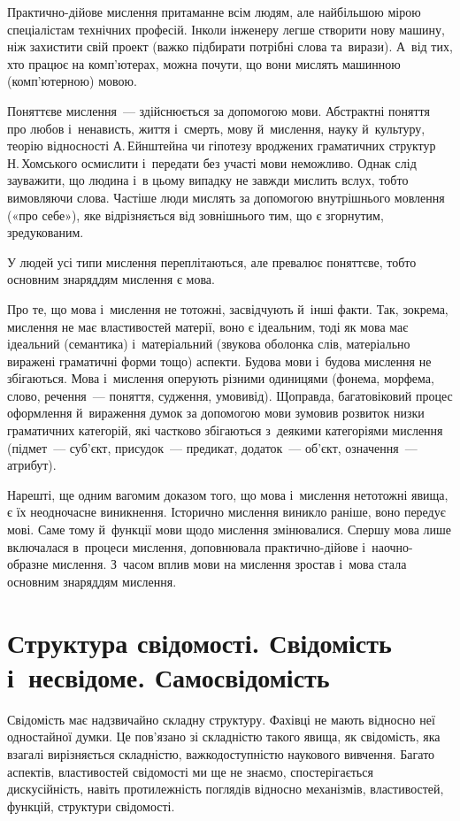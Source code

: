 \documentclass[a5paper,oneside,DIV=12,12pt,headings=small]{scrartcl}
\begin{document}
		Практично-дійове мислення притаманне всім людям, але найбільшою мірою спеціалістам технічних професій. Інколи інженеру легше створити нову машину, ніж захистити свій проект (важко підбирати потрібні слова та~вирази). А~від тих, хто працює на ком\-п'ю\-те\-рах, можна почути, що вони мислять машинною (ком\-п'ю\-тер\-ною) мовою.

		Поняттєве мислення~— здійснюється за допомогою мови. Абстрактні поняття про любов і~ненависть, життя і~смерть, мову й~мислення, науку й~культуру, теорію відносності А.\,Ейнштейна чи гіпотезу вроджених граматичних структур Н.\,Хомського осмислити і~передати без участі мови неможливо. Однак слід зауважити, що людина і~в цьому випадку не завжди мислить вслух, тобто вимовляючи слова. Частіше люди мислять за допомогою внутрішнього мовлення («про себе»), яке відрізняється від зовнішнього тим, що є згорнутим, зредукованим.

		У людей усі типи мислення переплітаються, але превалює поняттєве, тобто основним знаряддям мислення є мова.

		Про те, що мова і~мислення не тотожні, засвідчують й~інші факти. Так, зокрема, мислення не має властивостей матерії, воно є ідеальним, тоді як мова має ідеальний (семантика) і~матеріальний (звукова оболонка слів, матеріально виражені граматичні форми тощо) аспекти. Будова мови і~будова мислення не збігаються. Мова і~мислення оперують різними одиницями (фонема, морфема, слово, речення~— поняття, судження, умовивід). Щоправда, багатовіковий процес оформлення й~вираження думок за допомогою мови зумовив розвиток низки граматичних категорій, які частково збігаються з~деякими категоріями мислення (підмет~— суб'\-єкт, присудок~— предикат, додаток~— об'\-єкт, означення~— атрибут).

		Нарешті, ще одним вагомим доказом того, що мова і~мислення нетотожні явища, є їх неодночасне виникнення. Історично мислення виникло раніше, воно передує мові. Саме тому й~функції мови щодо мислення змінювалися. Спершу мова лише включалася в~процеси мислення, доповнювала практично-дійове і~наочно-образне мислення. З~часом вплив мови на мислення зростав і~мова стала основним знаряддям мислення.

	\section{Структура свідомості. Свідомість і~несвідоме. Самосвідомість}
		Свідомість має надзвичайно складну структуру. Фахівці не мають відносно неї одностайної думки. Це пов'\-я\-за\-но зі складністю такого явища, як свідомість, яка взагалі вирізняється складністю, важкодоступністю наукового вивчення. Багато аспектів, властивостей свідомості ми ще не знаємо, спостерігається дискусійність, навіть протилежність поглядів відносно механізмів, властивостей, функцій, структури свідомості.
\end{document}
